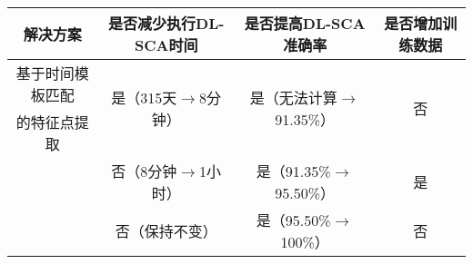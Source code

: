 {{{		\begin{table}[!h]
			\label{tab:solution2problem}
			\centering
			\footnotesize
			\begin{tabular}{cccc}
				\hline
				解决方案&是否减少执行DL-SCA时间&是否提高DL-SCA准确率 &是否增加训练数据\\
				\hline
				基于时间模板匹配&\multirow{2}{*}{是（315天$\rightarrow$8分钟）}&\multirow{2}{*}{是（无法计算$\rightarrow$91.35\%）}&\multirow{2}{*}{否}\\
				的特征点提取&&&\\
				\shujuzengqiang&否（8分钟$\rightarrow$1小时）&是（91.35\%$\rightarrow$95.50\%）&是\\
				\jiashejianyanguji&否（保持不变）&是（95.50\%$\rightarrow$100\%）&否\\
				\hline
			\end{tabular}
		\end{table}
		
	}
{

}}}
